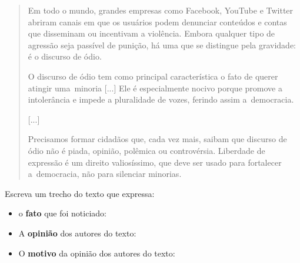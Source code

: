 \begin{escolha}
\begin{escolha}
{\begin{escolha}
\begin{quote}
Em todo o mundo, grandes empresas como Facebook, YouTube e Twitter
abriram canais em que os usuários podem denunciar conteúdos e contas que
disseminam ou incentivam a violência. Embora qualquer tipo de agressão
seja passível de punição, há uma que se distingue pela gravidade: é o
discurso de ódio.

O discurso de ódio tem como principal característica o fato de querer
atingir uma~minoria {[}...{]} Ele é especialmente nocivo porque promove
a intolerância e impede a pluralidade de vozes, ferindo assim
a~democracia.

{[}...{]}

Precisamos formar cidadãos que, cada vez mais, saibam que discurso de
ódio não é piada, opinião, polêmica ou controvérsia. Liberdade de
expressão é um direito valiosíssimo, que deve ser usado para fortalecer
a~democracia, não para silenciar minorias.

\end{quote}

\begin{escolha}
\item Escreva um trecho do texto que expressa:


\begin{itemize}
\item o \textbf{fato} que foi noticiado: 

\item A \textbf{opinião} dos autores do texto: 
  
\item O \textbf{motivo} da opinião dos autores do texto: 
\end{itemize}

\end{escolha}


\end{escolha}}
\end{escolha}
\end{escolha}

